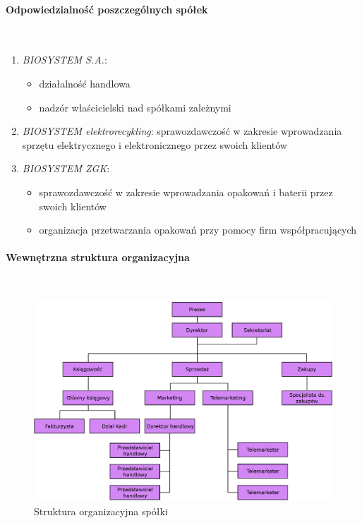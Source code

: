 \paragraph{Odpowiedzialność poszczególnych spółek} \ \\
\begin{enumerate}
	\item \emph{BIOSYSTEM S.A.}: 
		\begin{itemize}
			\item działalność handlowa
			\item nadzór właścicielski nad spółkami zależnymi
		\end{itemize}
	\item \emph{BIOSYSTEM elektrorecykling}: sprawozdawczość w zakresie wprowadzania sprzętu elektrycznego i elektronicznego przez swoich klientów \\
	\item \emph{BIOSYSTEM ZGK}:
		\begin{itemize}
			\item sprawozdawczość w zakresie wprowadzania opakowań i baterii przez swoich klientów
			\item organizacja przetwarzania opakowań przy pomocy firm współpracujących
		\end{itemize}
\end{enumerate}

\paragraph{Wewnętrzna struktura organizacyjna} \ \\

\begin{figure}[H]
    \centering
    \includegraphics[width=1\textwidth]{img/organization_chart.eps}
    \caption{Struktura organizacyjna spółki}
\end{figure}